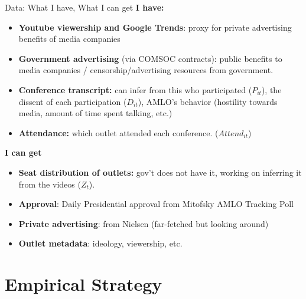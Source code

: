 \documentclass[10pt,aspectratio=169]{beamer}
\begin{document}
\begin{frame}{Data: What I have, What I can get}
\small
\textbf{I have:}
\begin{itemize}\setlength\itemsep{0.35em}
    \item \textbf{Youtube viewership and Google Trends}: proxy for private advertising benefits of media companies 
    \item \textbf{Government advertising} (via COMSOC contracts): public benefits to media companies / censorship/advertising resources from government. 
    
    \item \textbf{Conference transcript:} can infer from this who participated ($P_{it}$), the \alert{dissent} of each participation ($D_{it}$), AMLO's behavior (hostility towards media, amount of time spent talking, etc.)

    \item \textbf{Attendance:} which outlet attended each conference. ($Attend_{it}$)
\end{itemize}
\textbf{I can get}
\begin{itemize}\setlength\itemsep{0.35em}
    \item \textbf{Seat distribution of outlets:} gov't does not have it, working on inferring it from the videos ($Z_{t}$).
    \item \textbf{Approval}: Daily Presidential approval from Mitofsky AMLO Tracking Poll
    \item \textbf{Private advertising}: from Nielsen (far-fetched but looking around)
    \item \textbf{Outlet metadata}: ideology, viewership, etc. 
\end{itemize}
\end{frame}

\section{Empirical Strategy}
\end{document}
